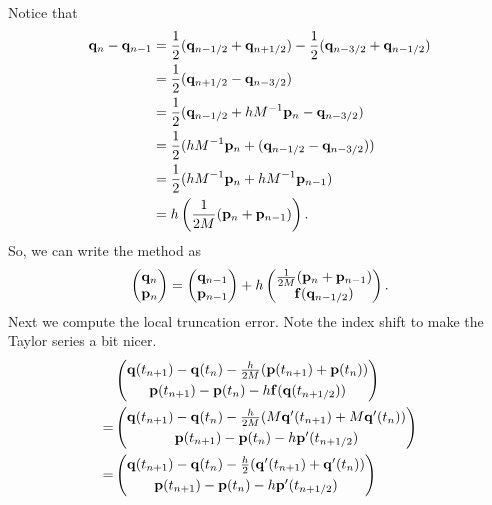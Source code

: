 \begin{solution}
\begin{enumerate}[(a)]
    Notice that 
    \begin{align*}
      \mathbf{q}_n - \mathbf{q}_{n-1}
      &= \frac12(\mathbf{q}_{n-1/2} + \mathbf{q}_{n+1/2}) - \frac12(\mathbf{q}_{n-3/2} + \mathbf{q}_{n-1/2}) \\
      &= \frac12(\mathbf{q}_{n+1/2} - \mathbf{q}_{n-3/2}) \\
      &= \frac12(\mathbf{q}_{n-1/2} + hM^{-1}\mathbf{p}_n - \mathbf{q}_{n-3/2}) \\
      &= \frac12(hM^{-1} \mathbf{p}_n + (\mathbf{q}_{n-1/2} - \mathbf{q}_{n-3/2})) \\
      &= \frac12(hM^{-1} \mathbf{p}_n + hM^{-1} \mathbf{p}_{n-1}) \\
      &= h\left(\frac{1}{2M}(\mathbf{p}_n + \mathbf{p}_{n-1})\right).
    \end{align*}
    So, we can write the method as 
    \[
      \begin{pmatrix}
        \mathbf{q}_n \\ \mathbf{p}_n
      \end{pmatrix} = 
      \begin{pmatrix}
        \mathbf{q}_{n-1} \\ \mathbf{p}_{n-1}
      \end{pmatrix} + h
      \begin{pmatrix}
        \frac{1}{2M}(\mathbf{p}_n + \mathbf{p}_{n-1}) \\
        \mathbf{f}(\mathbf{q}_{n-1/2})
      \end{pmatrix}.
    \]
    Next we compute the local truncation error. Note the index shift to make the Taylor series a bit nicer.
    \begin{align*}
      &
      \begin{pmatrix}
        \mathbf{q}(t_{n+1}) - \mathbf{q}(t_n) - \frac{h}{2M}(\mathbf{p}(t_{n+1}) + \mathbf{p}(t_n)) \\[0.3em]
        \mathbf{p}(t_{n+1}) - \mathbf{p}(t_n) - h \mathbf{f}(\mathbf{q}(t_{n+1/2}))
      \end{pmatrix} \\
      =& 
      \begin{pmatrix}
        \mathbf{q}(t_{n+1}) - \mathbf{q}(t_n) - \frac{h}{2M}(M \mathbf{q}'(t_{n+1}) + M \mathbf{q}'(t_n)) \\[0.3em]
        \mathbf{p}(t_{n+1}) - \mathbf{p}(t_n) - h \mathbf{p}'(t_{n+1/2})
      \end{pmatrix} \\
      =& 
      \begin{pmatrix}
        \mathbf{q}(t_{n+1}) - \mathbf{q}(t_n) - \frac{h}{2}(\mathbf{q}'(t_{n+1}) + \mathbf{q}'(t_n)) \\[0.3em]
        \mathbf{p}(t_{n+1}) - \mathbf{p}(t_n) - h \mathbf{p}'(t_{n+1/2})

\end{pmatrix}
\end{align*}
\end{enumerate}
\end{solution}

